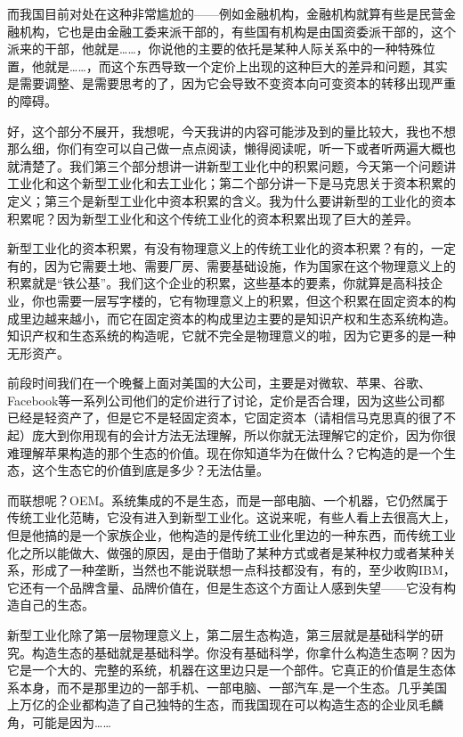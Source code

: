 \documentclass[UTF8, 12pt, a4paper]{ctexrep}
\begin{document}
而我国目前对处在这种非常尴尬的——例如金融机构，金融机构就算有些是民营金融机构，它也是由金融工委来派干部的，有些国有机构是由国资委派干部的，这个派来的干部，他就是……，你说他的主要的依托是某种人际关系中的一种特殊位置，他就是……，而这个东西导致一个定价上出现的这种巨大的差异和问题，其实是需要调整、是需要思考的了，因为它会导致不变资本向可变资本的转移出现严重的障碍。

好，这个部分不展开，我想呢，今天我讲的内容可能涉及到的量比较大，我也不想那么细，你们有空可以自己做一点点阅读，懒得阅读呢，听一下或者听两遍大概也就清楚了。我们第三个部分想讲一讲新型工业化中的积累问题，今天第一个问题讲工业化和这个新型工业化和去工业化；第二个部分讲一下是马克思关于资本积累的定义；第三个是新型工业化中资本积累的含义。我为什么要讲新型的工业化的资本积累呢？因为新型工业化和这个传统工业化的资本积累出现了巨大的差异。

新型工业化的资本积累，有没有物理意义上的传统工业化的资本积累？有的，一定有的，因为它需要土地、需要厂房、需要基础设施，作为国家在这个物理意义上的积累就是“铁公基”。我们这个企业的积累，这些基本的要素，你就算是高科技企业，你也需要一层写字楼的，它有物理意义上的积累，但这个积累在固定资本的构成里边越来越小，而它在固定资本的构成里边主要的是知识产权和生态系统构造。知识产权和生态系统的构造呢，它就不完全是物理意义的啦，因为它更多的是一种无形资产。

前段时间我们在一个晚餐上面对美国的大公司，主要是对微软、苹果、谷歌、Facebook等一系列公司他们的定价进行了讨论，定价是否合理，因为这些公司都已经是轻资产了，但是它不是轻固定资本，它固定资本（请相信马克思真的很了不起）庞大到你用现有的会计方法无法理解，所以你就无法理解它的定价，因为你很难理解苹果构造的那个生态的价值。现在你知道华为在做什么？它构造的是一个生态，这个生态它的价值到底是多少？无法估量。

而联想呢？OEM。系统集成的不是生态，而是一部电脑、一个机器，它仍然属于传统工业化范畴，它没有进入到新型工业化。这说来呢，有些人看上去很高大上，但是他搞的是一个家族企业，他构造的是传统工业化里边的一种东西，而传统工业化之所以能做大、做强的原因，是由于借助了某种方式或者是某种权力或者某种关系，形成了一种垄断，当然也不能说联想一点科技都没有，有的，至少收购IBM，它还有一个品牌含量、品牌价值在，但是生态这个方面让人感到失望——它没有构造自己的生态。

新型工业化除了第一层物理意义上，第二层生态构造，第三层就是基础科学的研究。构造生态的基础就是基础科学。你没有基础科学，你拿什么构造生态啊？因为它是一个大的、完整的系统，机器在这里边只是一个部件。它真正的价值是生态体系本身，而不是那里边的一部手机、一部电脑、一部汽车,是一个生态。几乎美国上万亿的企业都构造了自己独特的生态，而我国现在可以构造生态的企业凤毛麟角，可能是因为……
\end{document}
